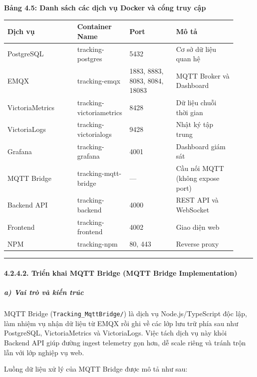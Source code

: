 \documentclass[13pt,a4paper]{extarticle}
\newcounter{none} %
\newcommand{\thesislongtableorignewline}{}
\let\thesislongtableorignewline\\
\renewcommand{\\}{\thesislongtableorignewline\hline}%
\let\\\thesislongtableorignewline
\newcommand{\thesistabletitle}[1]{%
  \begin{center}\textbf{#1}\end{center}%
}
\begin{document}
\thesistabletitle{Bảng 4.5: Danh sách các dịch vụ Docker và cổng truy cập}

{\def\LTcaptype{none} %
\begin{longtable}{|p{0.30\linewidth}|p{0.16\linewidth}|p{0.20\linewidth}|p{0.26\linewidth}|}
\hline \textbf{Dịch vụ} & \textbf{Container Name} & \textbf{Port} & \textbf{Mô tả} \\
\hline
\endhead
\hline
\endlastfoot
PostgreSQL & tracking-postgres & 5432 & Cơ sở dữ liệu quan hệ \\
EMQX & tracking-emqx & 1883, 8883, 8083, 8084, 18083 & MQTT Broker và
Dashboard \\
VictoriaMetrics & tracking-victoriametrics & 8428 & Dữ liệu chuỗi thời
gian \\
VictoriaLogs & tracking-victorialogs & 9428 & Nhật ký tập trung \\
Grafana & tracking-grafana & 4001 & Dashboard giám sát \\
MQTT Bridge & tracking-mqtt-bridge & --- & Cầu nối MQTT (không expose
port) \\
Backend API & tracking-backend & 4000 & REST API và WebSocket \\
Frontend & tracking-frontend & 4002 & Giao diện web \\
NPM & tracking-npm & 80, 443 & Reverse proxy \\
\end{longtable}
}

\begin{center}\rule{0.5\linewidth}{0.5pt}\end{center}

\paragraph{4.2.4.2. Triển khai MQTT Bridge (MQTT Bridge
Implementation)}\label{4242-triux1ec3n-khai-mqtt-bridge-mqtt-bridge-implementation}

\subparagraph{a) Vai trò và kiến
trúc}\label{a-vai-truxf2-vuxe0-kiux1ebfn-truxfac}

MQTT Bridge (\texttt{Tracking\_MqttBridge/}) là dịch vụ
Node.js/TypeScript độc lập, làm nhiệm vụ nhận dữ liệu từ EMQX rồi ghi về
các lớp lưu trữ phía sau như PostgreSQL, VictoriaMetrics và
VictoriaLogs. Việc tách dịch vụ này khỏi Backend API giúp đường ingest
telemetry gọn hơn, dễ scale riêng và tránh trộn lẫn với lớp nghiệp vụ
web.

Luồng dữ liệu xử lý của MQTT Bridge được mô tả như sau:
\end{document}

